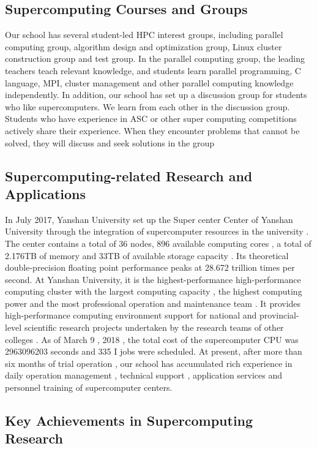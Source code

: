 \documentclass[a4paper,12pt]{article}
\begin{document}
\subsection{Supercomputing Courses and Groups}

Our school has several student-led HPC interest groups, including parallel computing group, algorithm design and optimization group, Linux cluster construction group and test group. In the parallel computing group, the leading teachers teach relevant knowledge, and students learn parallel programming, C language, MPI, cluster management and other parallel computing knowledge independently. In addition, our school has set up a discussion group for students who like supercomputers. We learn from each other in the discussion group. Students who have experience in ASC or other super computing competitions actively share their experience. When they encounter problems that cannot be solved, they will discuss and seek solutions in the group

\subsection{Supercomputing-related Research and Applications}

In July 2017, Yanshan University set up the Super center Center of Yanshan University through the integration of supercomputer resources in the university . The center contains a total of 36 nodes, 896 available computing cores , a total of 2.176TB of memory and 33TB of available storage capacity . Its theoretical double-precision floating point performance peaks at 28.672 trillion times per second. At Yanshan University, it is the highest-performance high-performance computing cluster with the largest computing capacity , the highest computing power and the most professional operation and maintenance team . It provides high-performance computing environment support for national and provincial-level scientific research projects undertaken by the research teams of other colleges . As of March 9 , 2018 , the total cost of the supercomputer CPU was 2963096203 seconds and 335 I jobs were scheduled. At present, after more than six months of trial operation , our school has accumulated rich experience in daily operation management , technical support , application services and personnel training of supercomputer centers.

\subsection{Key Achievements in Supercomputing Research}
\end{document}
